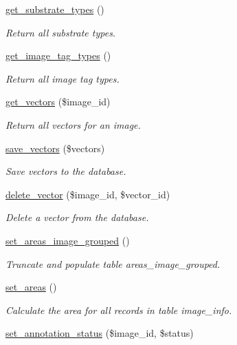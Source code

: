 \begin{DoxyCompactItemize}
\hyperlink{classDatabase_a9549b0da67a3ad1f6e2f569d67e107ec}{get\-\_\-substrate\-\_\-types} ()
\begin{DoxyCompactList}\small\item\em Return all substrate types. \end{DoxyCompactList}\item 
\hyperlink{classDatabase_a9470debaa4dbabb3fb87f48c8bece98b}{get\-\_\-image\-\_\-tag\-\_\-types} ()
\begin{DoxyCompactList}\small\item\em Return all image tag types. \end{DoxyCompactList}\item 
\hyperlink{classDatabase_a231a45ee6f3292841b5b1272d5fac725}{get\-\_\-vectors} (\$image\-\_\-id)
\begin{DoxyCompactList}\small\item\em Return all vectors for an image. \end{DoxyCompactList}\item 
\hyperlink{classDatabase_a9cbb05bd40bab06c6d1900b9e1905613}{save\-\_\-vectors} (\$vectors)
\begin{DoxyCompactList}\small\item\em Save vectors to the database. \end{DoxyCompactList}\item 
\hyperlink{classDatabase_a764fbabef33fae2ff24290462d954a99}{delete\-\_\-vector} (\$image\-\_\-id, \$vector\-\_\-id)
\begin{DoxyCompactList}\small\item\em Delete a vector from the database. \end{DoxyCompactList}\item 
\hyperlink{classDatabase_a0fba6ad55208137b25381d4b73954c2c}{set\-\_\-areas\-\_\-image\-\_\-grouped} ()
\begin{DoxyCompactList}\small\item\em Truncate and populate table {\ttfamily areas\-\_\-image\-\_\-grouped}. \end{DoxyCompactList}\item 
\hyperlink{classDatabase_afa6f84f0b79f0be0b4a81e9898c2b3e7}{set\-\_\-areas} ()
\begin{DoxyCompactList}\small\item\em Calculate the area for all records in table {\ttfamily image\-\_\-info}. \end{DoxyCompactList}\item 
\hyperlink{classDatabase_a4e89aa8e1053f8753a22572f65e0d2be}{set\-\_\-annotation\-\_\-status} (\$image\-\_\-id, \$status)

\end{DoxyCompactItemize}
